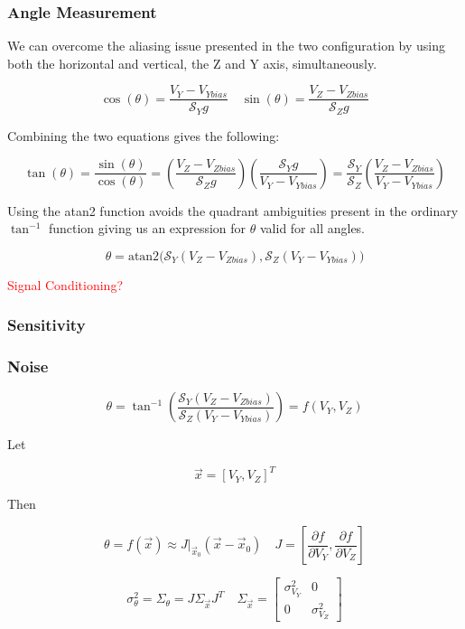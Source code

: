 \documentclass{article}
\newcommand{\xxx}[1]{\textcolor{red}{#1}}
\theoremstyle{plain}
\theoremstyle{definition}
\theoremstyle{remark}
\newcommand{\Sens}{\mathcal{S}}
\begin{document}
\subsubsection{Angle Measurement}

We can overcome the aliasing issue  presented in the two configuration by using both the horizontal and vertical, the Z and Y axis, simultaneously.  

$$ \cos(\theta) = \frac{V_Y-V_{Ybias}}{\Sens_{Y} g} \quad \sin(\theta) = \frac{V_{Z} - V_{Zbias}}{\Sens_{Z} g} $$

Combining the two equations gives the following:

$$ \tan(\theta) = \frac{\sin(\theta)}{\cos(\theta)} = \left(\frac{V_{Z} - V_{Zbias}}{\Sens_{Z} g}\right) \left( \frac{\Sens_{Y} g}{V_Y-V_{Ybias}} \right) = \frac{\Sens_{Y}}{\Sens_{Z}} \left( \frac{V_{Z} - V_{Zbias}}{V_{Y} - V_{Ybias}} \right)$$

Using the atan2 function avoids the quadrant ambiguities present in the ordinary $\tan^{-1}$ function giving us an expression for $\theta$ valid for all angles.

$$\theta = \text{atan2}\big( \Sens_{Y} \left( V_{Z} - V_{Zbias}\right),  \Sens_{Z} \left( V_{Y} - V_{Ybias}\right) \big)$$

\xxx{Signal Conditioning?}

\subsubsection{Sensitivity}

\subsubsection{Noise}

$$ \theta = \tan^{-1} \left( \frac{\Sens_{Y} \left( V_{Z} - V_{Zbias}\right)}{\Sens_{Z} \left( V_{Y} - V_{Ybias}\right)} \right) = f(V_{Y},V_{Z})$$

Let 

$$ \vec{x} = \left[ V_Y, V_Z \right]^T $$

Then

$$ \theta = f(\vec{x}) \approx J|_{\vec{x}_0} \left( \vec{x} - \vec{x}_{0}\right) \quad J = \left[ \frac{\partial f}{\partial V_{Y}}, \frac{\partial f }{\partial V_Z} \right] $$

$$ \sigma^2_{\theta} = \Sigma_{\theta} = J \Sigma_{\vec{x}} J^T  \quad 
\Sigma_{\vec{x}} = \left[
\begin{matrix}
\sigma^2_{V_{Y}}  & 0 \\
0 & \sigma^2_{V_{Z}} 
\end{matrix} \right]$$
\end{document}
